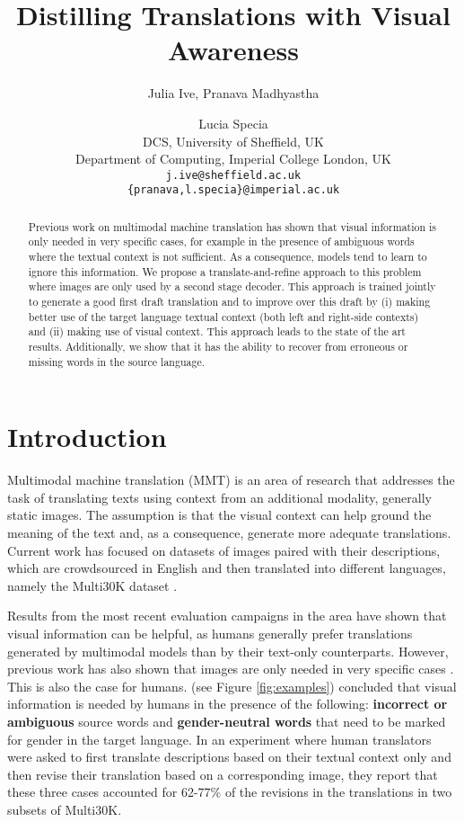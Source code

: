 \documentclass[11pt,a4paper]{article}
\title{Distilling Translations with Visual Awareness}
\author{Julia Ive, Pranava Madhyastha \and Lucia Specia\\
  DCS, University of Sheffield, UK\\
  Department of Computing, Imperial College London, UK \\
  {\tt j.ive@sheffield.ac.uk}\\
{\tt \{pranava,l.specia\}@imperial.ac.uk} \\}
\date{}
\begin{document}
\maketitle
\begin{abstract}
Previous work on multimodal machine translation has shown that visual information is only needed in very specific cases, for example in the presence of ambiguous words where the textual context is not sufficient. As a consequence, models tend to learn to ignore this information. 
We propose a translate-and-refine approach to this problem where images are only used by a second stage decoder. This approach is trained jointly to generate a good first draft translation and to improve over this draft by (i) making better use of the target language textual context (both left and right-side contexts) and (ii) making use of visual context. This approach leads to the state of the art results. Additionally, we show that it has the ability to recover from erroneous or missing words in the source language.
\end{abstract}

\section{Introduction}\label{sec:intro}

Multimodal machine translation (MMT) is an area of research that addresses the task of translating texts using context from an additional modality, generally static images. The assumption is that the visual context can help ground the meaning of the text and, as a consequence, generate more adequate translations. 
Current work has focused on datasets of images paired with their descriptions, which are crowdsourced in English and then translated into different languages, namely the Multi30K dataset \cite{elliott-etall_VL:2016}.

Results from the most recent evaluation campaigns in the area \cite{elliott-EtAl:2017:WMT,BarraultEtAl:2018} have shown that visual information can be helpful, as humans generally prefer translations generated by multimodal models than by their text-only counterparts. However, previous work has also shown that images are only needed in very specific cases \cite{lala-EtAl:2018:WMT}. This is also the case for humans.  (see Figure \ref{fig:examples}) concluded that visual information is needed by humans in the presence of the following: {\bf incorrect or ambiguous} source words and {\bf gender-neutral words} that need to be marked for gender in the target language. In an experiment where human translators were asked to first translate descriptions based on their textual context only and then revise their translation based on a corresponding image, they report that these three cases accounted for 62-77\% of the revisions in the translations in two subsets of Multi30K.  
\end{document}
